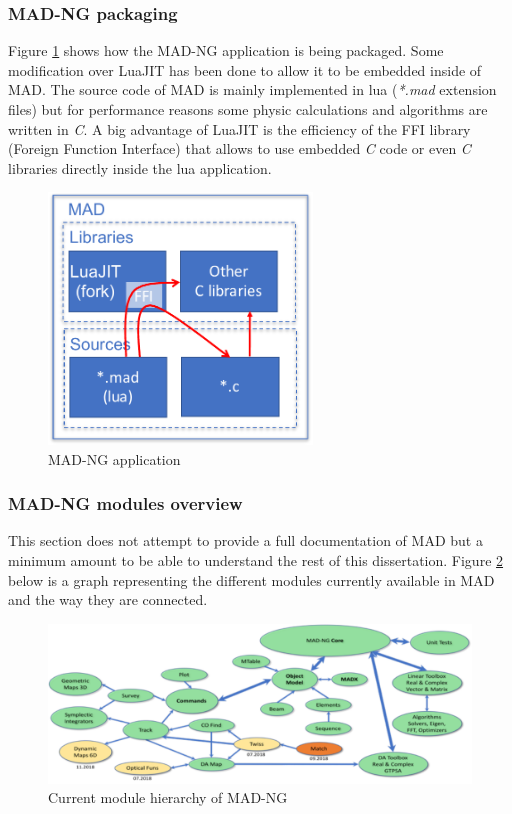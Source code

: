 \subsubsection{MAD-NG packaging}
\label{Subsec:mad-pk}

Figure \ref{fig:mad} shows how the MAD-NG application is being packaged. Some
modification over LuaJIT has been done to allow it to be embedded inside of MAD.
The source code of MAD is mainly implemented in lua (\emph{*.mad} extension
files) but for performance reasons some physic calculations and algorithms are
written in \emph{C}. A big advantage of LuaJIT is the efficiency of the FFI
library (Foreign Function Interface) that allows to use embedded \emph{C} code
or even \emph{C} libraries directly inside the lua application.

\begin{figure}[H]
    \centering
	\includegraphics[width=7cm]{./Images/MAD.pdf}
    \caption{MAD-NG application}
    \label{fig:mad}
\end{figure}

\subsubsection{MAD-NG modules overview}
\label{Subsec:mad-doc}

This section does not attempt to provide a full documentation of MAD but a
minimum amount to be able to understand the rest of this dissertation.
Figure \ref{fig:mad-graph} below is a graph representing the different
modules currently available in MAD and the way they are connected.

\begin{figure}[H]
    \centering
	\includegraphics[width=\textwidth]{./Images/mad-graph.pdf}
    \caption{Current module hierarchy of MAD-NG}
    \label{fig:mad-graph}
\end{figure}


